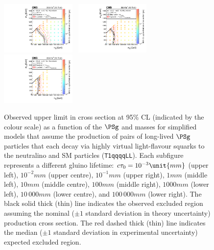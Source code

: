 \begin{figure}[!t]
  \includegraphics[width=0.33\textwidth]{Figures/T1qqqqLL1000XSEC}~
  \includegraphics[width=0.33\textwidth]{Figures/T1qqqqLL10000XSEC}~
  \includegraphics[width=0.33\textwidth]{Figures/T1qqqqLL100000XSEC}\\
  \caption{Observed upper limit in cross section at 95\% CL (indicated
    by the colour scale) as a function of the $\PSg$ and \PSGczDo
    masses for simplified models that assume the production of pairs
    of long-lived $\PSg$ particles that each decay via highly virtual
    light-flavour squarks to the neutralino and SM particles
    (\texttt{T1qqqqLL}). Each subfigure represents a different gluino
    lifetime: 
    $\ctau = 10^{-3}\unit{mm}$ (upper left),
    $10^{-2}\unit{mm}$ (upper centre),
    $10^{-1}\unit{mm}$ (upper right),
    $1\unit{mm}$ (middle left),
    $10\unit{mm}$ (middle centre),
    $100\unit{mm}$ (middle right),
    $1000\unit{mm}$ (lower left),
    $10\,000\unit{mm}$ (lower centre), 
    and $100\,000\unit{mm}$ (lower right). 
    The black solid thick (thin) line indicates the observed excluded
    region assuming the nominal (${\pm}1$ standard deviation in theory
    uncertainty) production cross section. The red dashed thick (thin)
    line indicates the median (${\pm}1$ standard deviation in
    experimental uncertainty) expected excluded region.  
  }
  \label{fig:limits-ll} 
\end{figure} 


